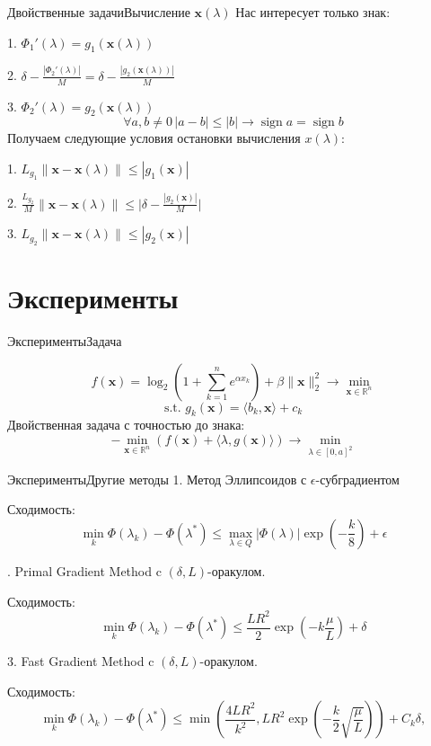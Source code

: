 \documentclass{beamer}
\DeclareMathOperator{\sign}{sign}
\begin{document}
\begin{frame}{Двойственные задачи}{Вычисление $\textbf{x}(\lambda)$}
Нас интересует только знак:

1. $\Phi_1'(\lambda) = g_1\left(\textbf{x}(\lambda)\right)$

2. $\delta -  \frac{|\Phi_2'(\lambda)|}{M} = \delta -  \frac{|g_2\left(\textbf{x}(\lambda)\right)|}{M} $

3. $\Phi_2'(\lambda) = g_2\left(\textbf{x}(\lambda)\right)$
\pause
$$\forall a, b\neq 0\,|a-b|\leq|b|\rightarrow \sign a = \sign b$$
\pause
Получаем следующие условия остановки вычисления $x(\lambda)$:

1. $L_{g_1}\|\textbf{x}-\textbf{x}(\lambda)\| \leq |g_1(\textbf{x})|$

2. $\frac{L_{g_2}}{M}\|\textbf{x}-\textbf{x}(\lambda)\|\leq \Big|\delta-\frac{|g_2\left(\textbf{x}\right)|}{M}\Big|$

3. $L_{g_2}\|\textbf{x}-\textbf{x}(\lambda)\| \leq |g_2(\textbf{x})|$
\end{frame}

\section{Эксперименты}

\begin{frame}{Эксперименты}{Задача}

$$f(\textbf{x}) = \log_2\left(1+\sum_{k=1}^ne^{\alpha x_k}\right) + \beta\|\textbf{x}\|^2_2 \rightarrow \min_{\textbf{x}\in\mathbb{R}^n}$$
$$\text{s.t. }g_k(\textbf{x}) = \langle b_k, \textbf{x}\rangle + c_k$$
Двойственная задача с точностью до знака:
$$-\min\limits_{\textbf{x}\in \mathbb{R}^n}\left(f(\textbf{x}) + \langle\lambda, g(\textbf{x})\rangle\right) \rightarrow \min_{\lambda \in [0,a]^2}$$
\end{frame}

\begin{frame}{Эксперименты}{Другие методы}
1. Метод Эллипсоидов с $\epsilon$-субградиентом

Сходимость:$$\min_k\Phi(\lambda_k) - \Phi(\lambda^*)\leq \max_{\lambda\in Q}|\Phi(\lambda)|\exp\left(-\frac{k}{8}\right) + \epsilon$$

. Primal Gradient Method c $(\delta,L)$-оракулом.

Сходимость:$$\min_k\Phi(\lambda_k) - \Phi(\lambda^*)\leq \frac{LR^2}{2}\exp\left(-k\frac{\mu}{L}\right) + \delta$$

\pause

3. Fast Gradient Method c $(\delta,L)$-оракулом.

Сходимость:$$\min_k\Phi(\lambda_k) - \Phi(\lambda^*)\leq \min\left(\frac{4LR^2}{k^2}, LR^2\exp\left(-\frac{k}{2}\sqrt{\frac{\mu}{L}}\right)\right) + C_k\delta,$$
\end{frame}
\end{document}
